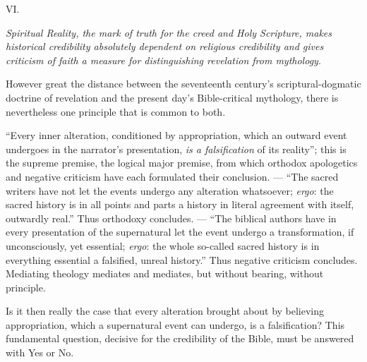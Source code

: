 \documentclass[12pt,a4paper,openany]{book}
\newcommand{\opage}[1]{\marginnote{\footnotesize\textit{[#1]}}}
\begin{document}
\begin{center}VI.\end{center}

\emph{Spiritual Reality, the mark of truth for
the creed and Holy Scripture, makes
historical credibility absolutely dependent
on religious credibility and gives criticism of faith a measure
for distinguishing revelation from mythology}.

However great the distance between the seventeenth century's
scriptural-dogmatic doctrine of revelation and the present day's
Bible-critical mythology, there is nevertheless one principle
that is common to both.

``Every inner alteration, conditioned by appropriation,
which an outward event undergoes in the narrator's
presentation, \emph{is a falsification} of its reality'';
this is the supreme premise, the logical major premise,
from which orthodox apologetics and
negative criticism have each formulated their conclusion. ---
``The sacred writers have not let the events
\setcounter{footnote}{0}%
\opage{35}undergo any alteration whatsoever; \emph{ergo}: the sacred
history is in all points and parts a history in literal agreement
with itself, outwardly real.'' Thus
orthodoxy concludes. --- ``The biblical authors have
in every presentation of the supernatural let the event
undergo a transformation, if unconsciously, yet essential;
\emph{ergo}: the whole so-called sacred history
is in everything essential a falsified, unreal history.''
Thus negative criticism concludes. Mediating theology
mediates and mediates, but without bearing, without principle.

Is it then really the case that every alteration brought about
by believing appropriation, which a supernatural event can
undergo, is a falsification? This fundamental question, decisive for the credibility of the Bible, must be answered
with Yes or No.
\end{document}
